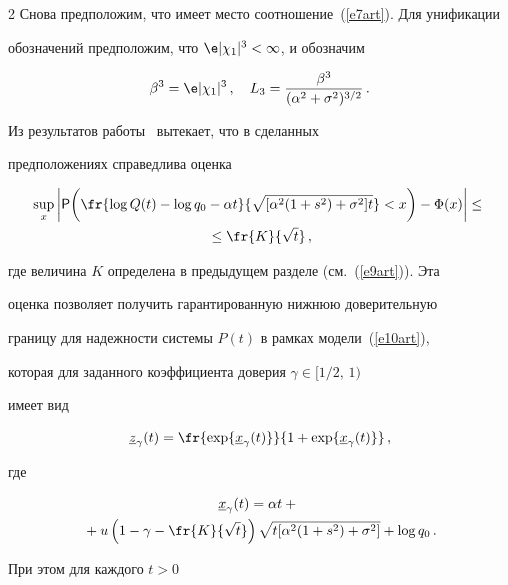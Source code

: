 \begin{multicols}{2}
Снова предположим, что имеет место соотношение~(\ref{e7art}). Для унификации


обозначений предположим, что $\e|\chi_1|^3<\infty$, и обозначим


$$


\beta^3 = \e|\chi_1|^3\,,\ \ \ L_3 =


\frac{\beta^3}{(\alpha^2+\sigma^2)^{3/2}}\,.


$$


Из результатов работы~\cite{10art} вытекает, что в сделанных


предположениях справедлива оценка


\begin{multline}


\sup_x\bigg|{\sf P}\bigg(\fr{\log Q(t)-\log q_0-\alpha


t}{\sqrt{[\alpha^2(1+s^2)+\sigma^2]t}}<x\bigg)-\Phi(x)\bigg|\le{}\\


{}\le \fr{K}{\sqrt{t}}\,,


\label{e11art}


\end{multline}


где величина $K$ определена в предыдущем разделе (см.~(\ref{e9art})). Эта


оценка позволяет получить гарантированную нижнюю доверительную


границу для надежности системы $P(t)$ в рамках модели~(\ref{e10art}),


которая для заданного коэффициента доверия $\gamma\in[1/2,\,1)$


имеет вид


$$


\underline z_{\gamma}(t)=\fr{\exp\{\underline


x_{\gamma}(t)\}}{1+\exp\{\underline x_{\gamma}(t)\}}\,,


$$


где


\begin{multline*}


\!\underline x_{\gamma}(t)=\alpha t+{}\\


{}+ u\left (1-\gamma-\fr{K}{\sqrt{t}}\right )\sqrt{t[\alpha^2(1+s^2)+\sigma^2]}+\log q_0\,.


\end{multline*}


При этом для каждого $t>0$


$$



\end{multicols}
